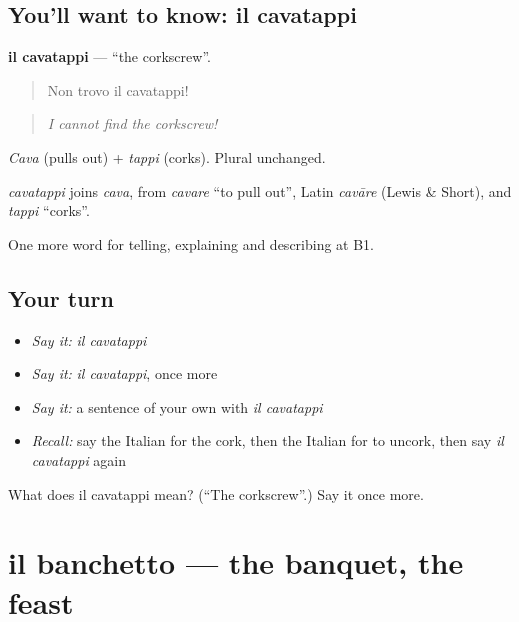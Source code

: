 \subsection*{You'll want to know: il cavatappi}
\textbf{il cavatappi} — \textquotedblleft{}the corkscrew\textquotedblright{}.

\begin{quote}
Non trovo il cavatappi!
\end{quote}

\begin{quote}
\emph{I cannot find the corkscrew!}
\end{quote}

\emph{Cava} (pulls out) + \emph{tappi} (corks). Plural unchanged.

\begin{cousinweb}
\emph{cavatappi} joins \emph{cava}, from \emph{cavare} \textquotedblleft{}to pull out\textquotedblright{}, Latin \emph{cavāre} (Lewis \& Short), and \emph{tappi} \textquotedblleft{}corks\textquotedblright{}.
\end{cousinweb}

\begin{grammarlens}[title={What you've built}]
One more word for telling, explaining and describing at B1.
\end{grammarlens}

\subsection*{Your turn}
\begin{itemize}
\raggedright
  \item \emph{Say it:} \emph{il cavatappi}
  \item \emph{Say it:} \emph{il cavatappi}, once more
  \item \emph{Say it:} a sentence of your own with \emph{il cavatappi}
  \item \emph{Recall:} say the Italian for the cork, then the Italian for to uncork, then say \emph{il cavatappi} again
\end{itemize}

\begin{tcolorbox}[breakable,colback=teal!4,colframe=teal!35!black,title={Before you move on}]
What does il cavatappi mean? (\textquotedblleft{}The corkscrew\textquotedblright{}.) Say it once more.
\end{tcolorbox}
\section[il banchetto]{il banchetto — the banquet, the feast}

